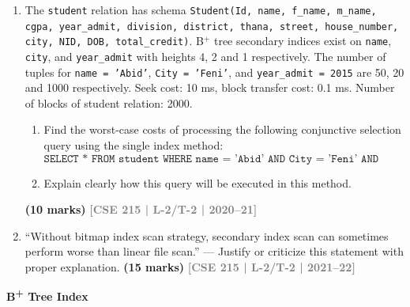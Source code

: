 \documentclass[12pt,a3paper]{article}
\newcommand{\yr}[1]{\hfill\textcolor{gray}{\small\textbf{[#1]}}}
\newcommand{\mk}[1]{\textcolor{orange!70!black}{\small\textbf{(#1 marks)}}}
\newcommand{\subtopic}[2]{%
  \vspace{10pt}
  \noindent\begin{tcolorbox}[colback=#1!8,colframe=#1,boxrule=0.6pt,arc=4pt,
    left=6pt,right=6pt,top=4pt,bottom=4pt]
    \small\bfseries\textcolor{#1}{#2}
  \end{tcolorbox}
  \vspace{2pt}
}
\begin{document}
\begin{enumerate}
\item The \texttt{student} relation has schema \texttt{Student(Id, name, f\_name, m\_name, cgpa, year\_admit, division, district, thana, street, house\_number, city, NID, DOB, total\_credit)}. B$^+$ tree secondary indices exist on \texttt{name}, \texttt{city}, and \texttt{year\_admit} with heights 4, 2 and 1 respectively. The number of tuples for \texttt{name = 'Abid'}, \texttt{City = 'Feni'}, and \texttt{year\_admit = 2015} are 50, 20 and 1000 respectively. Seek cost: 10 ms, block transfer cost: 0.1 ms. Number of blocks of student relation: 2000.

\begin{enumerate}
  \item Find the worst-case costs of processing the following conjunctive selection query using the single index method:
  \[\texttt{SELECT * FROM student WHERE name = 'Abid' AND City = 'Feni' AND year\_admit = 2015}\]
  \item Explain clearly how this query will be executed in this method.
\end{enumerate}
 \mk{10} \yr{CSE 215 | L-2/T-2 | 2020--21}

\item ``Without bitmap index scan strategy, secondary index scan can sometimes perform worse than linear file scan.'' --- Justify or criticize this statement with proper explanation.
\mk{15} \yr{CSE 215 | L-2/T-2 | 2021--22}

\end{enumerate}

\subtopic{cD}{B\textsuperscript{+} Tree Index}
\label{sub:s5-btree}
\end{document}
